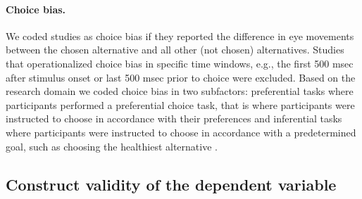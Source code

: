 \documentclass[english,natbib,man,floatsintext]{apa6}
\begin{document}
\paragraph{Choice bias.} We coded studies as choice bias if they reported the difference in eye movements between the chosen alternative and all other (not chosen) alternatives. Studies that operationalized choice bias in specific time windows, e.g., the first 500 msec after stimulus onset or last 500 msec prior to choice \citep{shimojo2003a} were excluded. Based on the research domain we coded choice bias in two subfactors: preferential tasks where participants performed a preferential choice task, that is where participants were instructed to choose in accordance with their preferences \citep{schotter2010a} and inferential tasks where participants were instructed to choose in accordance with a predetermined goal, such as choosing the healthiest alternative \citep{schotter2012a}.


\subsection{Construct validity of the dependent variable}
\end{document}
